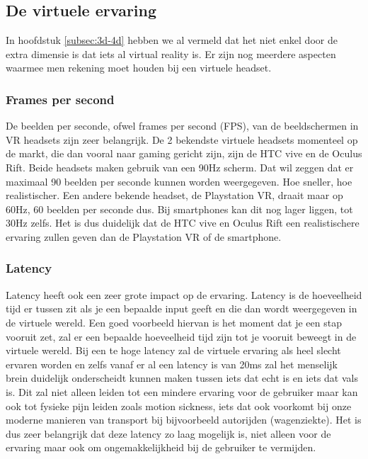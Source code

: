 \subsection{De virtuele ervaring}
\label{subsec:vr-ervaring}
In hoofdstuk \ref{subsec:3d-4d} hebben we al vermeld dat het niet enkel door de extra dimensie is dat iets al virtual reality is. Er zijn nog meerdere aspecten waarmee men rekening moet houden bij een virtuele headset.

\subsubsection{Frames per second}
\label{ssubsec:fps}
De beelden per seconde, ofwel frames per second (FPS), van de beeldschermen in VR headsets zijn zeer belangrijk. De 2 bekendste virtuele headsets momenteel op de markt, die dan vooral naar gaming gericht zijn, zijn de HTC vive en de Oculus Rift. Beide headsets maken gebruik van een 90Hz scherm. Dat wil zeggen dat er maximaal 90 beelden per seconde kunnen worden weergegeven. Hoe sneller, hoe realistischer. Een andere bekende headset, de Playstation VR, draait maar op 60Hz, 60 beelden per seconde dus. Bij smartphones kan dit nog lager liggen, tot 30Hz zelfs. Het is dus duidelijk dat de HTC vive en Oculus Rift een realistischere ervaring zullen geven dan de Playstation VR of de smartphone.

\subsubsection{Latency}
\label{ssubsec:latency}
Latency heeft ook een zeer grote impact op de ervaring. Latency is de hoeveelheid tijd er tussen zit als je een bepaalde input geeft en die dan wordt weergegeven in de virtuele wereld. Een goed voorbeeld hiervan is het moment dat je een stap vooruit zet, zal er een bepaalde hoeveelheid tijd zijn tot je vooruit beweegt in de virtuele wereld. Bij een te hoge latency zal de virtuele ervaring als heel slecht ervaren worden en zelfs vanaf er al een latency is van 20ms zal het menselijk brein duidelijk onderscheidt kunnen maken tussen iets dat echt is en iets dat vals is. Dit zal niet alleen leiden tot een mindere ervaring voor de gebruiker maar kan ook tot fysieke pijn leiden zoals motion sickness, iets dat ook voorkomt bij onze moderne manieren van transport bij bijvoorbeeld autorijden (wagenziekte). Het is dus zeer belangrijk dat deze latency zo laag mogelijk is, niet alleen voor de ervaring maar ook om ongemakkelijkheid bij de gebruiker te vermijden.

